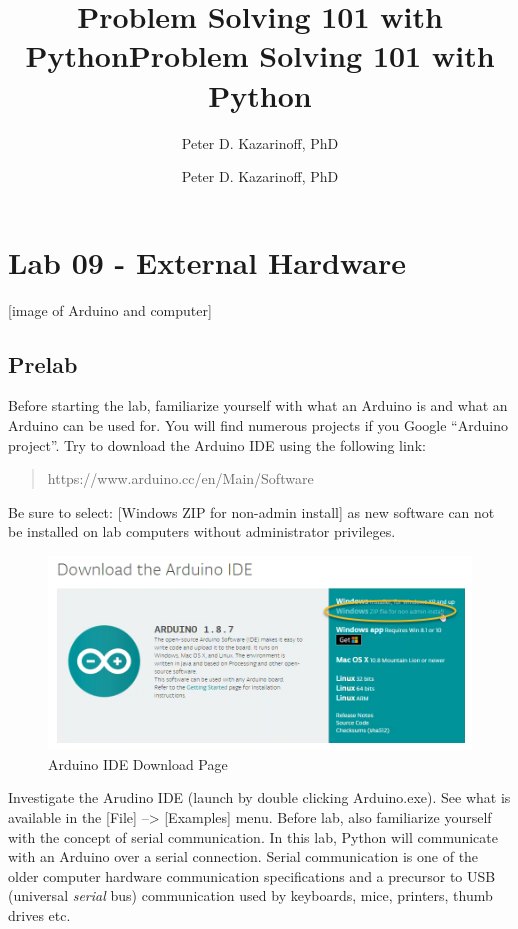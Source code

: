 \documentclass[11pt]{article}
\title{Problem Solving 101 with Python}
\author{Peter D. Kazarinoff, PhD}
\date{}
\title{Problem Solving 101 with Python}
\author{Peter D. Kazarinoff, PhD}
\date{}
\makeatletter
\def\maxwidth{\ifdim\Gin@nat@width>\linewidth\linewidth
    \else\Gin@nat@width\fi}
\let\Oldincludegraphics\includegraphics
\renewcommand{\includegraphics}[1]{\Oldincludegraphics[width=.8\maxwidth]{#1}}
\makeatother
\begin{document}
    
    
    

    
    

    
    \hypertarget{lab-09---external-hardware}{%
\section{Lab 09 - External Hardware}\label{lab-09---external-hardware}}

    {[}image of Arduino and computer{]}

    \hypertarget{prelab}{%
\subsection{Prelab}\label{prelab}}

Before starting the lab, familiarize yourself with what an Arduino is
and what an Arduino can be used for. You will find numerous projects if
you Google ``Arduino project''. Try to download the Arduino IDE using
the following link:

\begin{quote}
https://www.arduino.cc/en/Main/Software
\end{quote}

Be sure to select: {[}Windows ZIP for non-admin install{]} as new
software can not be installed on lab computers without administrator
privileges.

\begin{figure}
\centering
\includegraphics{images/arduino_download_page.png}
\caption{Arduino IDE Download Page}
\end{figure}

Investigate the Arudino IDE (launch by double clicking Arduino.exe). See
what is available in the {[}File{]} --\textgreater{} {[}Examples{]}
menu. Before lab, also familiarize yourself with the concept of serial
communication. In this lab, Python will communicate with an Arduino over
a serial connection. Serial communication is one of the older computer
hardware communication specifications and a precursor to USB (universal
\emph{serial} bus) communication used by keyboards, mice, printers,
thumb drives etc.
\end{document}
